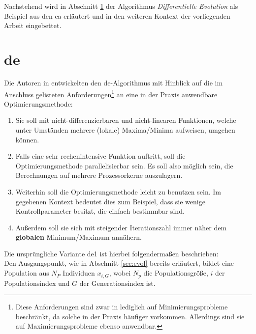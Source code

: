 		Nachstehend wird in Abschnitt \ref{sec:de} der Algorithmus \textit{Differentielle Evolution} als Beispiel aus den \gls{ea} erläutert und in den weiteren Kontext der vorliegenden Arbeit eingebettet.
	

	\section{\gls{de}}
	\label{sec:de}

		Die Autoren in \cite{storn-price-de} entwickelten den \gls{de}-Algorithmus mit Hinblick auf die im Anschluss gelisteten Anforderungen\footnote{Diese Anforderungen sind zwar in \cite{storn-price-de} lediglich auf Minimierungsprobleme beschränkt, da solche in der Praxis häufiger vorkommen. Allerdings sind sie auf Maximierungsprobleme ebenso anwendbar.}
		an eine in der Praxis anwendbare Optimierungsmethode:
		\begin{enumerate}
			\item Sie soll mit nicht-differenzierbaren und nicht-linearen 
			Funktionen, welche unter Umständen mehrere (lokale) Maxima/Minima 
			aufweisen, umgehen können.
			\item Falls eine sehr rechenintensive Funktion auftritt, soll die Optimierungsmethode parallelisierbar sein. Es soll also möglich sein, die Berechnungen auf mehrere Prozessorkerne auszulagern.
			\item Weiterhin soll die Optimierungsmethode leicht zu benutzen sein. Im gegebenen Kontext bedeutet dies zum Beispiel, dass sie wenige Kontrollparameter besitzt, die einfach bestimmbar sind.
			\item Außerdem soll sie sich mit steigender Iterationszahl immer 
			näher dem \textbf{globalen} Minimum/Maximum annähern.
		\end{enumerate}
		
		Die ursprüngliche Variante \gls{de}1 ist hierbei folgendermaßen beschrieben:\\
		Den Ausgangspunkt, wie in Abschnitt \ref{sec:evol} bereits erläutert, bildet eine Population aus $N_{P}$ Individuen $x_{i, G}$, wobei $N_{p}$ die Populationsgröße, $i$ der Populationsindex und $G$ der Generationsindex ist. 